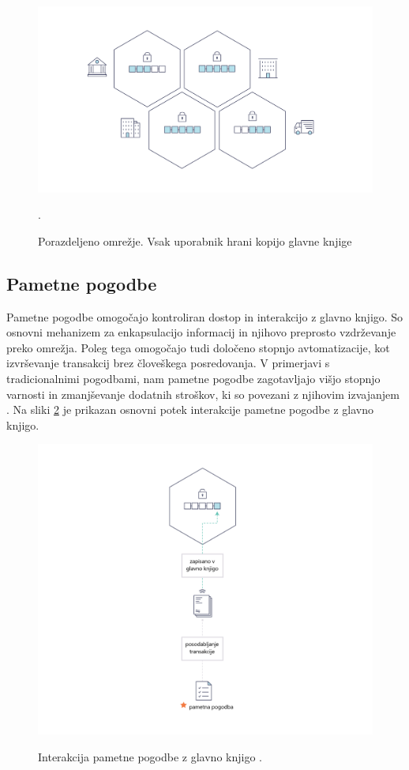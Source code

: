 \documentclass[a4paper, 12pt]{book}
\begin{document}
\begin{figure}[h]
	\includegraphics[width=1.0\textwidth]{slike/basic_network.png}
	\label{hyperledger_basic_network}
	\caption{Porazdeljeno omrežje. Vsak uporabnik hrani kopijo glavne knjige \cite{hyperledgerDocs}}.
\end{figure}

\subsection{Pametne pogodbe}
Pametne pogodbe omogočajo kontroliran dostop in interakcijo z glavno knjigo.
So osnovni mehanizem za enkapsulacijo informacij in njihovo preprosto vzdrževanje preko omrežja.
Poleg tega omogočajo tudi določeno stopnjo avtomatizacije, kot izvrševanje transakcij brez človeškega posredovanja.
V primerjavi s tradicionalnimi pogodbami, nam pametne pogodbe zagotavljajo višjo stopnjo varnosti in zmanjševanje dodatnih stroškov, ki so povezani z njihovim izvajanjem \cite{atzei2017survey}.
Na sliki \ref{smart_contract} je prikazan osnovni potek interakcije pametne pogodbe z glavno knjigo.

\begin{figure}[h]
	\includegraphics[width=1.0\textwidth]{slike/Smart_Contract_sl.png}
	\label{smart_contract}
	\caption{Interakcija pametne pogodbe z glavno knjigo \cite{hyperledgerDocs}.}
\end{figure}
\end{document}
